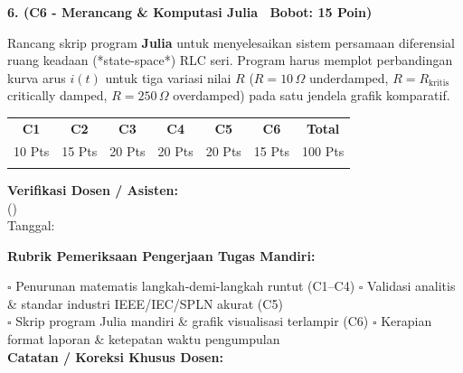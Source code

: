 \documentclass[10pt,a4paper]{article}
\begin{document}
\vspace{3.5mm}

\noindent\textbf{6. (C6 - Merancang \& Komputasi Julia \textbar\ Bobot: 15 Poin)}\par\vspace{0.8mm}
{\footnotesize Rancang skrip program \textbf{Julia} untuk menyelesaikan sistem persamaan diferensial ruang keadaan (*state-space*) RLC seri. Program harus memplot perbandingan kurva arus $i(t)$ untuk tiga variasi nilai $R$ ($R = 10\,\Omega$ underdamped, $R = R_{\text{kritis}}$ critically damped, $R = 250\,\Omega$ overdamped) pada satu jendela grafik komparatif.}\par

\vfill

\noindent\begin{minipage}[b]{0.62\textwidth}%
  \centering
  \scriptsize
  \begin{tabular}{|c|c|c|c|c|c|c|}
    \hline
    \rowcolor{unibblue}
    \textbf{\color{white}C1} & \textbf{\color{white}C2} & \textbf{\color{white}C3} & \textbf{\color{white}C4} & \textbf{\color{white}C5} & \textbf{\color{white}C6} & \textbf{\color{white}Total} \\
    \rowcolor{unibblue!10}
    10 Pts & 15 Pts & 20 Pts & 20 Pts & 20 Pts & 15 Pts & 100 Pts \\
    \hline
    & & & & & & \\[3mm]
    \hline
  \end{tabular}%
\end{minipage}%
\hfill%
\begin{minipage}[b]{0.35\textwidth}%
  \centering
  \scriptsize
  \textbf{Verifikasi Dosen / Asisten:}\\[6mm]
  (\dotfill)\\[1mm]
  \tiny Tanggal: \dotfill
\end{minipage}\par

\vspace{2mm}
\begin{tcolorbox}[colback=white,colframe=unibblue!40!black,colbacktitle=unibblue!10,coltitle=unibblue,boxrule=0.5pt,arc=2pt,left=5pt,right=5pt,top=3pt,bottom=3pt,title=\textbf{\tiny Catatan Evaluasi \& Umpan Balik Dosen Pengampu}]
  \tiny
  \textbf{Rubrik Pemeriksaan Pengerjaan Tugas Mandiri:}\par\vspace{0.8mm}
  $\square$ Penurunan matematis langkah-demi-langkah runtut (C1--C4) \hfill $\square$ Validasi analitis \& standar industri IEEE/IEC/SPLN akurat (C5)\\[0.8mm]
  $\square$ Skrip program Julia mandiri \& grafik visualisasi terlampir (C6) \hfill $\square$ Kerapian format laporan \& ketepatan waktu pengumpulan\\[2.0mm]
  \textbf{Catatan / Koreksi Khusus Dosen:}\\[1.6cm]
\end{tcolorbox}
\end{document}
